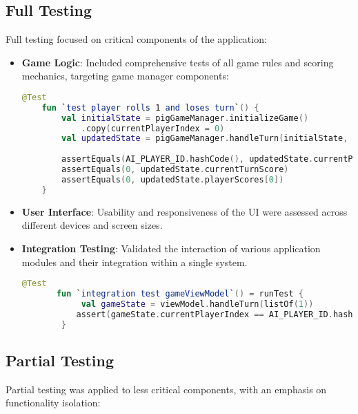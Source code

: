 \subsection{Full Testing}

Full testing focused on critical components of the application:
\begin{itemize}
    \item \textbf{Game Logic}: Included comprehensive tests of all game rules and scoring mechanics, targeting game manager components:
    \begin{lstlisting}[language=Kotlin, caption=Unit Test for Game Logic, label=lst:game_logic_unit]
    @Test
    fun `test player rolls 1 and loses turn`() {
        val initialState = pigGameManager.initializeGame()
            .copy(currentPlayerIndex = 0)
        val updatedState = pigGameManager.handleTurn(initialState, 1)
            
        assertEquals(AI_PLAYER_ID.hashCode(), updatedState.currentPlayerIndex)
        assertEquals(0, updatedState.currentTurnScore)
        assertEquals(0, updatedState.playerScores[0])
    } 
    \end{lstlisting}
    \label{lst:game_logic_unit}

    \item \textbf{User Interface}: Usability and responsiveness of the UI were assessed across different devices and screen sizes.
    \item \textbf{Integration Testing}: Validated the interaction of various application modules and their integration within a single system.
    \begin{lstlisting}[language=Kotlin, caption=Integration Test for Game View Model, label=lst:integration_game_view_model]
       @Test
       fun `integration test gameViewModel`() = runTest {
            val gameState = viewModel.handleTurn(listOf(1))
           assert(gameState.currentPlayerIndex == AI_PLAYER_ID.hashCode())
        } 
    \end{lstlisting}
    \label{lst:integration_game_view_model}
\end{itemize}

\subsection{Partial Testing}

Partial testing was applied to less critical components, with an emphasis on functionality isolation:

